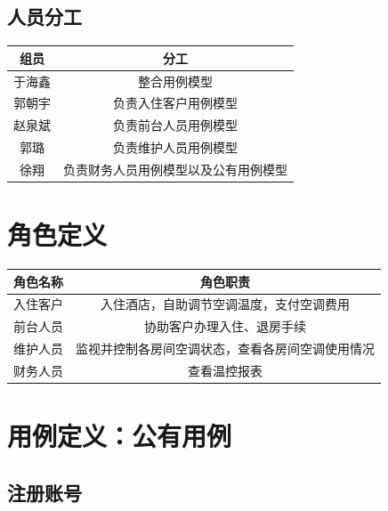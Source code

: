 \documentclass[black,normal,cn]{elegantnote}
\begin{document}
\subsection{人员分工}

\begin{center}
    \begin{tabular}{cc}
        \toprule
        \textbf{组员} & \textbf{分工}                        \\
        \midrule
        于海鑫        & 整合用例模型                         \\
        郭朝宇        & 负责入住客户用例模型                 \\
        赵泉斌        & 负责前台人员用例模型                 \\
        郭璐          & 负责维护人员用例模型                 \\
        徐翔          & 负责财务人员用例模型以及公有用例模型 \\
        \bottomrule
    \end{tabular}
\end{center}

\section{角色定义}

\begin{center}
    \begin{tabular}{cc}
        \toprule
        \textbf{角色名称} & \textbf{角色职责}                                \\
        \midrule
        入住客户          & 入住酒店，自助调节空调温度，支付空调费用         \\
        前台人员          & 协助客户办理入住、退房手续                       \\
        维护人员          & 监视并控制各房间空调状态，查看各房间空调使用情况 \\
        财务人员          & 查看温控报表                                     \\
        \bottomrule
    \end{tabular}
\end{center}

\section{用例定义：公有用例}

\subsection{注册账号}
\end{document}
